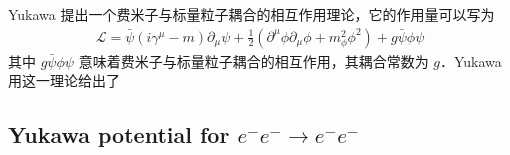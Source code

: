 
Yukawa 提出一个费米子与标量粒子耦合的相互作用理论，它的作用量可以写为
\begin{equation}
\begin{aligned}
\mathcal{L}=\bar\psi (i\gamma^\mu-m) \partial_\mu \psi+
\frac{1}{2}(\partial^\mu \phi \partial_\mu \phi + m_\phi^2 \phi^2) + g\bar\psi\phi\psi
\end{aligned}
\end{equation}
其中 $g\bar\psi \phi\psi$ 意味着费米子与标量粒子耦合的相互作用，其耦合常数为 $g$．Yukawa 用这一理论给出了
\subsection{Yukawa potential for $e^-e^-\rightarrow e^-e^-$}

